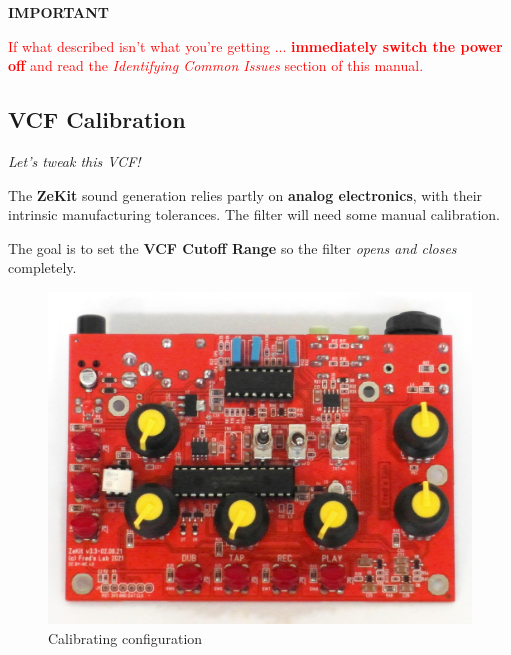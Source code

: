 \documentclass{scrartcl}
\begin{document}
\vspace{0.5cm}
\textbf{IMPORTANT}

\begin{tcolorbox}
    \textcolor{red}{
        If what described isn't what you're getting ... \textbf{immediately switch the power off} and read the \emph{Identifying Common Issues} section of this manual.
    }
\end{tcolorbox}

\pagebreak
\subsection{VCF Calibration}

\Large
\emph{Let's tweak this VCF!}
\normalsize

The \textbf{ZeKit} sound generation relies partly on \textbf{analog electronics}, with their intrinsic manufacturing tolerances. The filter will need some manual calibration.

The goal is to set the \textbf{VCF Cutoff Range} so the filter \emph{opens and closes} completely.

\begin{figure}[!ht]
    \begin{center}
        \includegraphics[scale=0.30]{assets/zekit-calibrate.jpg}
        \caption{Calibrating configuration}
    \end{center}
\end{figure}
\end{document}
